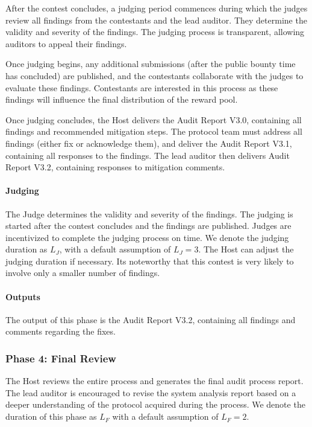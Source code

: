 \documentclass[10pt]{extarticle}
\begin{document}
After the contest concludes, a judging period commences during which the
judges review all findings from the contestants and the lead auditor.
They determine the validity and severity of the findings. The judging
process is transparent, allowing auditors to appeal their findings.

Once judging begins, any additional submissions (after the public bounty
time has concluded) are published, and the contestants collaborate with
the judges to evaluate these findings. Contestants are interested in
this process as these findings will influence the final distribution of
the reward pool.

Once judging concludes, the Host delivers the Audit Report V3.0,
containing all findings and recommended mitigation steps. The protocol
team must address all findings (either fix or acknowledge them), and
deliver the Audit Report V3.1, containing all responses to the findings.
The lead auditor then delivers Audit Report V3.2, containing responses
to mitigation comments.

\paragraph{Judging}\label{judging-2}

The Judge determines the validity and severity of the findings. The
judging is started after the contest concludes and the findings are
published. Judges are incentivized to complete the judging process on
time. We denote the judging duration as \(L_J\), with a default
assumption of \(L_J = 3\). The Host can adjust the judging duration if
necessary. It\textquotesingle s noteworthy that this contest is very
likely to involve only a smaller number of findings.

\paragraph{Outputs}\label{outputs-2}

The output of this phase is the Audit Report V3.2, containing all
findings and comments regarding the fixes.

\subsubsection{ Phase 4: Final
Review}\label{434-phase-4-final-review}

The Host reviews the entire process and generates the final audit
process report. The lead auditor is encouraged to revise the system
analysis report based on a deeper understanding of the protocol acquired
during the process. We denote the duration of this phase as \(L_F\) with
a default assumption of \(L_F = 2\).
\end{document}
